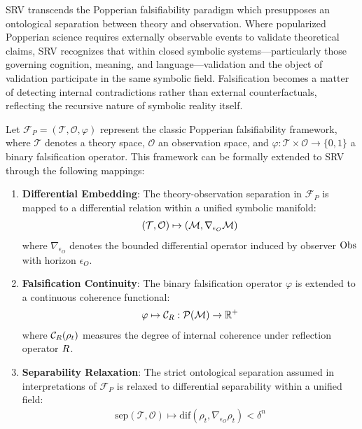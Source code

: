 \begin{remark}
\label{remark:bk7_unnamed_remark_04}
SRV transcends the Popperian falsifiability paradigm which presupposes an ontological separation between theory and observation. Where popularized Popperian science requires externally observable events to validate theoretical claims, SRV recognizes that within closed symbolic systems—particularly those governing cognition, meaning, and language—validation and the object of validation participate in the same symbolic field. Falsification becomes a matter of detecting internal contradictions rather than external counterfactuals, reflecting the recursive nature of symbolic reality itself.
\end{remark}
\begin{scholium}
\label{scholium:bk7_popperian_extension}
Let $\mathcal{F}_P = (\mathcal{T}, \mathcal{O}, \varphi)$ represent the classic Popperian falsifiability framework, where $\mathcal{T}$ denotes a theory space, $\mathcal{O}$ an observation space, and $\varphi: \mathcal{T} \times \mathcal{O} \rightarrow \{0,1\}$ a binary falsification operator. This framework can be formally extended to SRV through the following mappings:
\begin{enumerate}[label=(\roman*)]
\item \textbf{Differential Embedding}: The theory-observation separation in $\mathcal{F}_P$ is mapped to a differential relation within a unified symbolic manifold:
\begin{align}
(\mathcal{T}, \mathcal{O}) \mapsto (\mathcal{M}, \nabla_{\epsilon_O}\mathcal{M})
\end{align}
where $\nabla_{\epsilon_O}$ denotes the bounded differential operator induced by observer $\mathrm{Obs}$ with horizon $\epsilon_O$.
\item \textbf{Falsification Continuity}: The binary falsification operator $\varphi$ is extended to a continuous coherence functional:
\begin{align}
\varphi \mapsto \mathcal{C}_{R}: \mathcal{P}(\mathcal{M}) \rightarrow \mathbb{R}^+
\end{align}
where $\mathcal{C}_{R}(\rho_t)$ measures the degree of internal coherence under reflection operator $R$.
\item \textbf{Separability Relaxation}: The strict ontological separation assumed in interpretations of $\mathcal{F}_P$ is relaxed to differential separability within a unified field:
\begin{align}
\text{sep}(\mathcal{T}, \mathcal{O}) \mapsto \text{dif}(\rho_t, \nabla_{\epsilon_O}\rho_t) < \delta^n

\end{align}
\end{enumerate}
\end{scholium}
